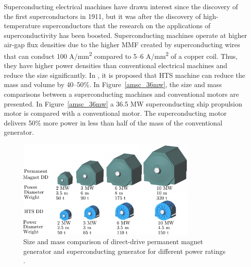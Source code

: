 \documentclass[a4paper, 11pt]{article} %
\begin{document}
Superconducting electrical machines have drawn interest since the discovery of the first superconductors in 1911, but it was after the discovery of high-temperature superconductors that the research on the applications of superconductivity has been boosted. Superconducting machines operate at higher air-gap flux densities due to the higher MMF created by superconducting wires that can conduct 100 A/mm\textsuperscript{2} compared to 5--6 A/mm\textsuperscript{2} of a copper coil. Thus, they have higher power densities than conventional
electrical machines and reduce the size significantly. In \cite{Klaus2006}, it is proposed that HTS machine can reduce the mass and volume by 40--50\%. In Figure~\ref{amsc_36mw}, the size and mass comparisons between a superconducting machines and conventional motors are presented. In Figure~\ref{amsc_36mw} a 36.5 MW superconducting ship propulsion motor is compared with a conventional motor. The superconducting motor delivers 50\% more power in less than half of the mass of the conventional generator.

\begin{figure}[t]
    \centering
    \includegraphics[width=0.8\textwidth]{amsc_ddpm_hts_comparison}
  	\caption{Size and mass comparison of direct-drive permanent magnet generator and superconducting generator for different power ratings \cite{amsc_presentation}.} 
  	\label{ddpm_hts_compare}
\end{figure}
\end{document}
